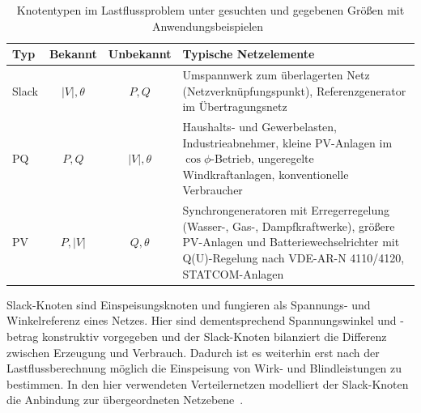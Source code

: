 
\begin{table}[h]
	\centering
	\caption{Knotentypen im Lastflussproblem unter gesuchten und gegebenen Größen mit Anwendungsbeispielen~\cite{TinneyHart1967, Stott1974, Milano2010, Zimmerman2011}}
	\label{tab:knotentypen}
	\begin{tabular}{lccp{8.9cm}}
		\toprule
		Typ & Bekannt & Unbekannt & Typische Netzelemente \\
        \hline\hline
		Slack & $|V|,\theta$ & $P,Q$ &{ \footnotesize Umspannwerk zum überlagerten Netz (Netzverknüpfungspunkt), Referenzgenerator im Übertragungsnetz }\\
		\midrule
		PQ    & $P,Q$        & $|V|,\theta$ & {\footnotesize Haushalts- und Gewerbelasten, Industrieabnehmer, kleine PV-Anlagen im $\cos\phi$-Betrieb, ungeregelte Windkraftanlagen, konventionelle Verbraucher} \\
		\midrule
		PV    & $P,|V|$      & $Q,\theta$ & {\footnotesize Synchrongeneratoren mit Erregerregelung (Wasser-, Gas-, Dampfkraftwerke), größere PV-Anlagen und Batteriewechselrichter mit Q(U)-Regelung nach VDE-AR-N 4110/4120, STATCOM-Anlagen} \\
		\bottomrule
	\end{tabular}
\end{table}

Slack-Knoten sind Einspeisungsknoten und fungieren als Spannungs- und Winkelreferenz eines Netzes. 
Hier sind dementsprechend Spannungswinkel und -betrag konstruktiv vorgegeben und der Slack-Knoten bilanziert die Differenz zwischen Erzeugung und Verbrauch.
Dadurch ist es weiterhin erst nach der Lastflussberechnung möglich die Einspeisung von Wirk- und Blindleistungen zu bestimmen. 
In den hier verwendeten Verteilernetzen modelliert der Slack-Knoten die Anbindung zur übergeordneten Netzebene~\cite{Stott1974, Milano2010, Kundur1994}.\\

